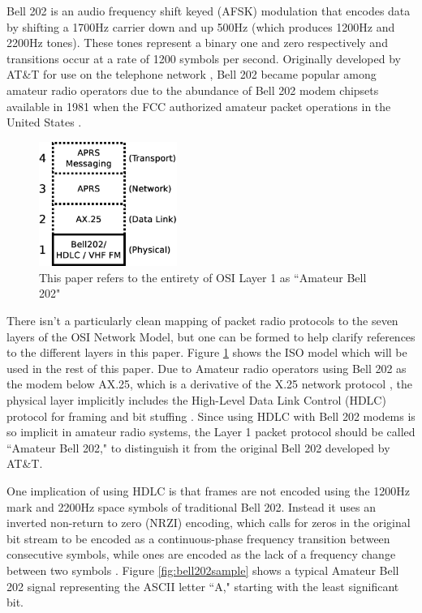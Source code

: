 Bell 202 is an audio frequency shift keyed (AFSK) modulation that
encodes data by shifting a 1700Hz carrier down and up 500Hz (which
produces 1200Hz and 2200Hz tones).
These tones represent a binary one and zero respectively and transitions occur
at a rate of 1200 symbols per second.
Originally developed by AT\&T for use on the telephone network \cite{202tspec},
Bell 202 became popular among amateur radio operators due to the abundance
of Bell 202 modem chipsets available in 1981 when the FCC authorized
amateur packet operations in the United States \cite{gatewaypacket}.

\begin{figure}[!b]
	\centering
	\includegraphics[width=0.4\textwidth]{src/dia/osi_bell202}
	\caption{This paper refers to the entirety of OSI
	Layer 1 as ``Amateur Bell 202"}
	\label{fig:osibell}
\end{figure}

There isn't a particularly clean
mapping of packet radio protocols to the seven layers of the OSI
Network Model, but one can be formed 
to help clarify references to the different layers in this paper.
Figure \ref{fig:osibell} shows the ISO model which will be used in
the rest of this paper.
Due to Amateur radio operators
using Bell 202 as the modem below AX.25, which is a derivative of
the X.25 network protocol \cite[\S1.1]{ax25spec}, 
the physical layer implicitly includes the High-Level Data Link Control (HDLC) 
protocol for framing and bit stuffing \cite{n1vgphy}.
Since using HDLC with Bell 202 modems is so implicit in amateur radio systems, 
the Layer 1 packet protocol should be called ``Amateur Bell 202," to
distinguish it from the original Bell 202 developed by AT\&T.

One implication of using HDLC is that frames are not encoded using the
1200Hz mark and 2200Hz space symbols of traditional Bell 202.
Instead it uses an
inverted non-return to zero (NRZI) encoding,
which calls for zeros in the original bit stream to be encoded as a
continuous-phase frequency transition between consecutive symbols, 
while ones are encoded as
the lack of a frequency change between two symbols \cite{iso13239}.
Figure \ref{fig:bell202sample} shows a typical Amateur Bell 202
signal representing the ASCII letter ``A," starting with the least significant bit.

